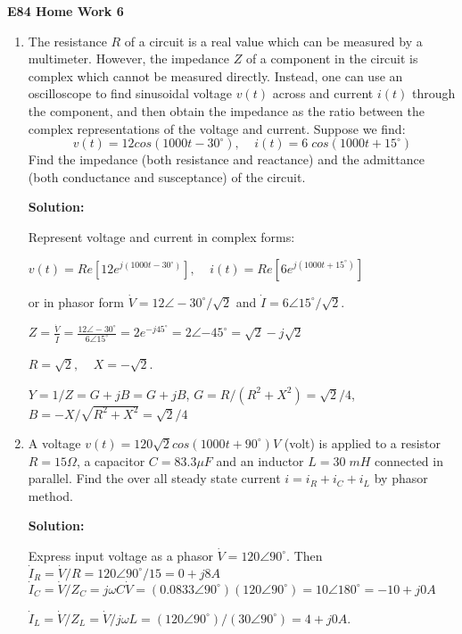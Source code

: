 \usepackage{html}

\begin{center}
{\Large \bf E84 Home Work 6}
\end{center}

\begin{enumerate}


\item The resistance $R$ of a circuit is a real value which can be measured
by a multimeter. However, the impedance $Z$ of a component in the circuit is 
complex which cannot be measured directly. Instead, one can use an oscilloscope 
to find sinusoidal voltage $v(t)$ across and current $i(t)$ through the component,
and then obtain the impedance as the ratio between the complex representations of 
the voltage and current. Suppose we find:
\[ v(t)=12 cos(1000t-30^\circ),\;\;\;\; i(t)=6\;cos(1000t+15^\circ) \]
Find the impedance (both resistance and reactance) and the admittance (both
conductance and susceptance) of the circuit.

{\bf Solution:}

Represent voltage and current in complex forms:

$v(t)=Re[12e^{j(1000 t-30^\circ)}],\;\;\;\;i(t)=Re[6e^{j(1000 t+15^\circ)}]$

or in phasor form $\dot{V}=12 \angle -30^\circ/\sqrt{2}$ and 
$\dot{I}=6 \angle 15^\circ/\sqrt{2}$.

$Z=\frac{\dot{V}}{\dot{I}}=\frac{12\angle -30^\circ}{6\angle 15^\circ}
=2e^{-j45^\circ}=2\angle{-45^\circ}=\sqrt{2}-j\sqrt{2}$

$R=\sqrt{2},\;\;\;\;X=-\sqrt{2}$.

$Y=1/Z=G+jB=G+jB$, $G=R/(R^2+X^2)=\sqrt{2}/4$, $B=-X/\sqrt{R^2+X^2}=\sqrt{2}/4$

\item A voltage $v(t)=120\sqrt{2} cos(1000t+90^\circ) V$ (volt) is applied to 
a resistor $R=15\Omega$, a capacitor $C=83.3\mu F$ and an inductor $L=30\; mH$ 
connected in parallel. Find the over all steady state current $i=i_R+i_C+i_L$ 
by phasor method.

{\bf Solution:}

Express input voltage as a phasor $\dot{V}=120\angle{90^\circ}$.  
Then $\dot{I}_R=\dot{V}/R=120\angle{90^\circ}/15=0+j8 A$
 $\dot{I}_C=\dot{V}/Z_C=j\omega C\dot{V}=(0.0833\angle 90^\circ)(120\angle{90^\circ})
 	=10\angle 180^\circ=-10+j0 A$

$\dot{I}_L=\dot{V}/Z_L=\dot{V}/j\omega L=(120\angle 90^\circ)/(30\angle{90^\circ})=4+j0 A$.


\end{enumerate}
